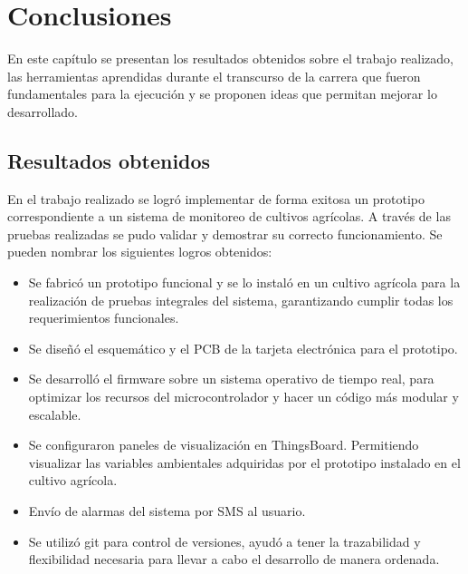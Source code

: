 
\chapter{Conclusiones} %
En este capítulo se presentan los resultados obtenidos sobre el trabajo realizado, las herramientas aprendidas durante el transcurso de la carrera que fueron fundamentales para la ejecución y se proponen ideas que permitan mejorar lo desarrollado.
\label{Chapter5} %

  


\section{Resultados obtenidos}
En el trabajo realizado se logró implementar de forma exitosa un prototipo correspondiente a un sistema de monitoreo de cultivos agrícolas. A través de las pruebas realizadas se pudo validar y demostrar su correcto funcionamiento.
Se pueden nombrar los siguientes logros obtenidos:
\begin{itemize}
\item Se fabricó un prototipo funcional y se lo instaló en un cultivo agrícola para la realización de pruebas integrales del sistema, garantizando cumplir todas los requerimientos funcionales.
\item Se diseñó el esquemático y el PCB de la tarjeta electrónica para el prototipo.
\item Se desarrolló el firmware sobre un sistema operativo de tiempo real, para optimizar los recursos del microcontrolador y hacer un código más modular y escalable.
\item Se configuraron paneles de visualización en ThingsBoard. Permitiendo visualizar las variables ambientales adquiridas por el prototipo instalado en el  cultivo agrícola.
\item Envío de alarmas del sistema por SMS al usuario.
\item Se utilizó git para control de versiones, ayudó a tener la trazabilidad y flexibilidad necesaria para llevar a cabo el desarrollo de manera ordenada.
\end{itemize}


